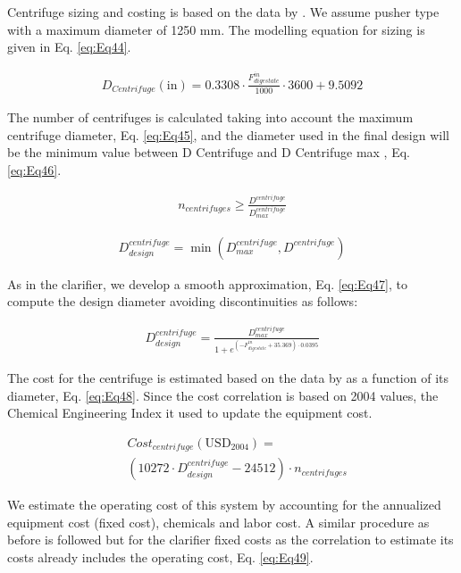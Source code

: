 \begin{refsection}[referencesCh2]
Centrifuge sizing and costing is based on the data by \citet{green2008perry}. We assume pusher type with a maximum diameter of 1250 mm. The modelling equation for sizing is given in Eq. \ref{eq:Eq44}.

\begin{align}
	D_{Centrifuge}\left( \text{in} \right) = 0.3308 \cdot \frac{F_{digestate}^{in}}{1000}\cdot 3600 + 9.5092 \label{eq:Eq44}
\end{align}

The number of centrifuges is calculated taking into account the maximum centrifuge diameter, Eq. \ref{eq:Eq45}, and the diameter used in the final design will be the minimum value between D Centrifuge and D Centrifuge max , Eq. \ref{eq:Eq46}.

\begin{align}
	{n}_{centrifuges} \ge \frac{D^{centrifuge}}{D_{max}^{centrifuge}} \label{eq:Eq45}
\end{align}

\begin{align}
	D_{design}^{centrifuge} = \min \left( {D_{max}^{centrifuge}, D^{centrifuge}} \right) \label{eq:Eq46}
\end{align}

As in the clarifier, we develop a smooth approximation, Eq. \ref{eq:Eq47}, to compute the design diameter avoiding discontinuities as follows:

\begin{align}
	D_{design}^{centrifuge} = \frac{D_{max}^{centrifuge}}{1 + {e^{\left( { -F_{digestate}^{in} + 35.369} \right) \cdot 0.0395}}} \label{eq:Eq47}
\end{align}

The cost for the centrifuge is estimated based on the data by \citet{green2008perry} as a function of its diameter, Eq. \ref{eq:Eq48}. Since the cost correlation is based on 2004 values, the Chemical Engineering Index it used to update the equipment cost.

\begin{align}
	& Cost_{centrifuge}\left( \text{USD}_{2004}  \right) = \label{eq:Eq48} \\
	& \left( {10272 \cdot D_{design}^{centrifuge} - 24512} \right) \cdot {n}_{centrifuges} \nonumber
\end{align}

We estimate the operating cost of this system by accounting for the annualized equipment cost (fixed cost), chemicals and labor cost. A similar procedure as before is followed \citep{vian1975pronostico} but for the clarifier fixed costs as the correlation to estimate its costs already includes the operating cost, Eq. \ref{eq:Eq49}.


\end{refsection}
